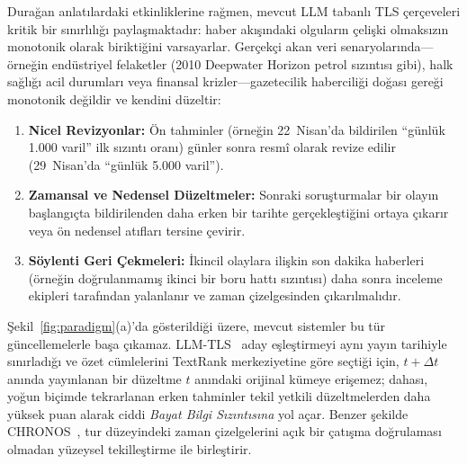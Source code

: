 ﻿\documentclass[journal]{IEEEtran}
\begin{document}
Dura\u{g}an anlat{\i}lardaki etkinliklerine ra\u{g}men, mevcut LLM tabanl{\i} TLS \c{c}erçeveleri kritik bir s{\i}n{\i}rl{\i}l{\i}\u{g}{\i} payla\c{s}maktad{\i}r: haber ak{\i}\c{s}{\i}ndaki olgular{\i}n \c{c}eli\c{s}ki olmaks{\i}z{\i}n monotonik olarak birikti\u{g}ini varsayarlar. Ger\c{c}ek\c{c}i akan veri senaryolar{\i}nda---\"{o}rne\u{g}in end\"{u}striyel felaketler (2010 Deepwater Horizon petrol s{\i}z{\i}nt{\i}s{\i} gibi), halk sa\u{g}l{\i}\u{g}{\i} acil durumlar{\i} veya finansal krizler---gazetecilik habercili\u{g}i do\u{g}as{\i} gere\u{g}i monotonik de\u{g}ildir ve kendini d\"{u}zeltir:
\begin{enumerate}
    \item \textbf{Nicel Revizyonlar:} \"{O}n tahminler (\"{o}rne\u{g}in 22~Nisan'da bildirilen ``g\"{u}nl\"{u}k 1.000 varil'' ilk s{\i}z{\i}nt{\i} oran{\i}) g\"{u}nler sonra resm\^{i} olarak revize edilir (29~Nisan'da ``g\"{u}nl\"{u}k 5.000 varil'').
    \item \textbf{Zamansal ve Nedensel D\"{u}zeltmeler:} Sonraki soru\c{s}turmalar bir olay{\i}n ba\c{s}lang{\i}\c{c}ta bildirilenden daha erken bir tarihte ger\c{c}ekle\c{s}ti\u{g}ini ortaya \c{c}{\i}kar{\i}r veya \"{o}n nedensel at{\i}flar{\i} tersine \c{c}evirir.
    \item \textbf{S\"{o}ylenti Geri \c{C}ekmeleri:} \.{I}kincil olaylara ili\c{s}kin son dakika haberleri (\"{o}rne\u{g}in do\u{g}rulanmam{\i}\c{s} ikinci bir boru hatt{\i} s{\i}z{\i}nt{\i}s{\i}) daha sonra inceleme ekipleri taraf{\i}ndan yalanlan{\i}r ve zaman \c{c}izelgesinden \c{c}{\i}kar{\i}lmal{\i}d{\i}r.
\end{enumerate}

\c{S}ekil~\ref{fig:paradigm}(a)'da g\"{o}sterildi\u{g}i \"{u}zere, mevcut sistemler bu t\"{u}r g\"{u}ncellemelerle ba\c{s}a \c{c}{\i}kamaz. LLM-TLS~\cite{hu2024moments} aday e\c{s}le\c{s}tirmeyi ayn{\i} yay{\i}n tarihiyle s{\i}n{\i}rlad{\i}\u{g}{\i} ve \"{o}zet c\"{u}mlelerini TextRank merkeziyetine g\"{o}re se\c{c}ti\u{g}i i\c{c}in, $t + \Delta t$ an{\i}nda yay{\i}nlanan bir d\"{u}zeltme $t$ an{\i}ndaki orijinal k\"{u}meye eri\c{s}emez; dahas{\i}, yo\u{g}un bi\c{c}imde tekrarlanan erken tahminler tekil yetkili d\"{u}zeltmelerden daha y\"{u}ksek puan alarak ciddi \textit{Bayat Bilgi S{\i}z{\i}nt{\i}s{\i}na} yol a\c{c}ar. Benzer \c{s}ekilde CHRONOS~\cite{wu2025unfolding}, tur d\"{u}zeyindeki zaman \c{c}izelgelerini a\c{c}{\i}k bir \c{c}at{\i}\c{s}ma do\u{g}rulamas{\i} olmadan y\"{u}zeysel tekille\c{s}tirme ile birle\c{s}tirir.
\end{document}
